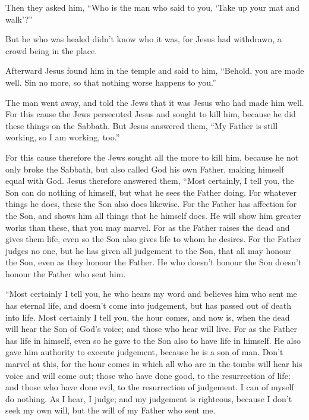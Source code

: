  Then they asked him, ``Who is the man who said to you,
`Take up your mat and walk'?''

 But he who was healed didn't know who it was, for Jesus
had withdrawn, a crowd being in the place.

 Afterward Jesus found him in the temple and said to him,
``Behold, you are made well. Sin no more, so that nothing worse happens
to you.''

 The man went away, and told the Jews that it was Jesus
who had made him well.  For this cause the Jews
persecuted Jesus and sought to kill him, because he did these things on
the Sabbath.  But Jesus answered them, ``My Father is
still working, so I am working, too.''

 For this cause therefore the Jews sought all the more to
kill him, because he not only broke the Sabbath, but also called God his
own Father, making himself equal with God.  Jesus
therefore answered them, ``Most certainly, I tell you, the Son can do
nothing of himself, but what he sees the Father doing. For whatever
things he does, these the Son also does likewise.  For
the Father has affection for the Son, and shows him all things that he
himself does. He will show him greater works than these, that you may
marvel.  For as the Father raises the dead and gives them
life, even so the Son also gives life to whom he desires.
 For the Father judges no one, but he has given all
judgement to the Son,  that all may honour the Son, even
as they honour the Father. He who doesn't honour the Son doesn't honour
the Father who sent him.

 ``Most certainly I tell you, he who hears my word and
believes him who sent me has eternal life, and doesn't come into
judgement, but has passed out of death into life.  Most
certainly I tell you, the hour comes, and now is, when the dead will
hear the Son of God's voice; and those who hear will live.
 For as the Father has life in himself, even so he gave
to the Son also to have life in himself.  He also gave
him authority to execute judgement, because he is a son of man.
 Don't marvel at this, for the hour comes in which all
who are in the tombs will hear his voice  and will come
out; those who have done good, to the resurrection of life; and those
who have done evil, to the resurrection of judgement.  I
can of myself do nothing. As I hear, I judge; and my judgement is
righteous, because I don't seek my own will, but the will of my Father
who sent me.

